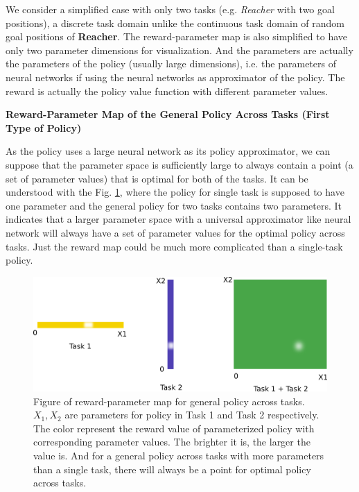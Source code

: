 \documentclass{article}
\begin{document}
We consider a simplified case with only two tasks (e.g. \textit{Reacher} with two goal positions), a discrete task domain unlike the continuous task domain of random goal positions of \textbf{Reacher}. The reward-parameter map is also simplified to have only two parameter dimensions for visualization. And the parameters are actually the parameters of the policy (usually large dimensions), i.e. the parameters of neural networks if using the neural networks as approximator of the policy. The reward is actually the policy value function with different parameter values.

\textbf{Reward-Parameter Map of the General Policy Across Tasks (First Type of Policy)}

As the policy uses a large neural network as its policy approximator, we can suppose that the parameter space is sufficiently large to always contain a point (a set of parameter values) that is optimal for both of the tasks. It can be understood with the Fig. \ref{fig:understand1}, where the policy for single task is supposed to have one parameter and the general policy for two tasks contains two parameters. It indicates that a larger parameter space with a universal approximator like neural network will always have a set of parameter values for the optimal policy across tasks. Just the reward map could be much more complicated than a single-task policy.
\begin{figure}[htbp]
	\centering
	\includegraphics[scale=0.3]{img/understand1.png}
	\caption{Figure of reward-parameter map for general policy across tasks. $X_1, X_2$ are parameters for policy in Task 1 and Task 2 respectively. The color represent the reward value of parameterized policy with corresponding parameter values. The brighter it is, the larger the value is. And for a general policy across tasks with more parameters than a single task, there will always be a point for optimal policy across tasks.}
	\label{fig:understand1}
\end{figure}
\end{document}
